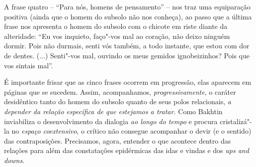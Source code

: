 {A frase quatro -- ``Para nós, homens de pensamento'' -- nos traz uma
equiparação positiva (ainda que o homem do subsolo não nos conheça), ao
passo que a última frase nos apresenta o homem do subsolo com o chicote
em riste diante da alteridade: ``Eu vos inquieto, faço"-vos mal ao
coração, não deixo ninguém dormir. Pois não durmais, senti vós também, a
todo instante, que estou com dor de dentes. (...) Senti"-vos mal, ouvindo
os meus gemidos ignobeizinhos? Pois que vos sintais mal''.

É importante frisar que as cinco frases ocorrem em progressão, elas
aparecem em páginas que se sucedem. Assim, acompanhamos,
\emph{progressivamente}, o caráter desidêntico tanto do homem do subsolo
quanto de seus polos relacionais, \emph{a depender da relação específica
de que estejamos a tratar.} Como Bakhtin inviabiliza o desenvolvimento
da dialogia \emph{ao longo do tempo} e procura cristalizá"-la no
\emph{espaço coextensivo}, o crítico não consegue acompanhar o devir (e
o sentido) das contraposições. Precisamos, agora, entender o que
acontece dentro das relações para além das constatações epidérmicas das
idas e vindas e dos \emph{ups and downs}.

}
